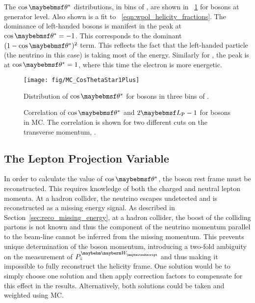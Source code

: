 The $\cos\thetastar$ distributions, in bins of \PtW, are shown in
\fig~\ref{fig:wpol_costheta} for \PWp bosons at generator level. Also shown is a
fit to \eqn~\ref{eqn:wpol_helicity_fractions}. The dominance of left-handed \PW
bosons is manifest in the peak at $\cos\thetastar = -1$. This corresponds to the
dominant $(1-\cos\thetastar)^2$ term. This reflects the fact that the
left-handed particle (the neutrino in this case) is taking most of the
energy. Similarly for \PWm, the peak is at $\cos\thetastar = 1$, where this time
the electron is more energetic.

\begin{figure}[h!]
\centering
\texttt{[image: fig/MC\_CosThetaStar1Plus]}
\caption[Distribution of $\cos\thetastar$ for \PWp bosons in three bins of
\PtW.]{Distribution of $\cos\thetastar$ for \PWp bosons in three bins of \PtW.}
\label{fig:wpol_costheta}
\end{figure}

\begin{figure}[h!]
\centering
{}\quad
\subfloat[[$\PtW > \unit{400}{\GeV}$]{
  \label{fig:wpol_costheta_corr400}\texttt{[image: fig/LP\_corr400]}}\quad
\caption[Correlation of $\cos\thetastar$ and $2\LP - 1$ for \PW bosons in
\ac{MC}]{Correlation of $\cos\thetastar$ and $2\LP - 1$ for \PW bosons in
  \ac{MC}. The correlation is shown for two different cuts on the transverse
  momentum, \PtW.}
\label{fig:wpol_costheta_corr}
\end{figure}

\subsection{The Lepton Projection Variable}
\label{sec:wpol_lp}
In order to calculate the value of $\cos\thetastar$, the \PW boson rest frame
must be reconstructed. This requires knowledge of both the charged and neutral
lepton momenta. At a hadron collider, the neutrino escapes undetected and is
reconstructed as a missing energy signal. As described in
Section~\ref{sec:reco_missing_energy}, at a hadron collider, the boost of the
colliding partons is not known and thus the component of the neutrino momentum
parallel to the beam-line cannot be inferred from the missing momentum. This
prevents unique determination of the \PW boson momentum, introducing a two-fold
ambiguity on the measurement of $P^{\PW}_z$ and thus making it impossible to
fully reconstruct the helicity frame. One solution would be to simply choose one
solution and then apply correction factors to compensate for this effect in the
results. Alternatively, both solutions could be taken and weighted using \ac{MC}.

